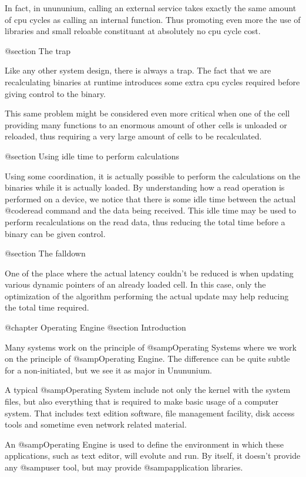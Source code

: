  In fact, in unununium, calling an external service takes exactly the same
 amount of cpu cycles as calling an internal function.  Thus promoting even
 more the use of libraries and small reloable constituant at absolutely no
 cpu cycle cost.

@section The trap

 Like any other system design, there is always a trap.  The fact that we are
 recalculating binaries at runtime introduces some extra cpu cycles required
 before giving control to the binary.

 This same problem might be considered even more critical when one of the cell
 providing many functions to an enormous amount of other cells is unloaded
 or reloaded, thus requiring a very large amount of cells to be recalculated.

@section Using idle time to perform calculations

 Using some coordination, it is actually possible to perform the calculations
 on the binaries while it is actually loaded.  By understanding how a read
 operation is performed on a device, we notice that there is some idle time
 between the actual @code{read} command and the data being received.  This
 idle time may be used to perform recalculations on the read data, thus
 reducing the total time before a binary can be given control.
 
@section The falldown

 One of the place where the actual latency couldn't be reduced is when updating
 various dynamic pointers of an already loaded cell.  In this case, only the
 optimization of the algorithm performing the actual update may help reducing
 the total time required.

@chapter Operating Engine
@section Introduction

 Many systems work on the principle of @samp{Operating Systems} where we work
 on the principle of @samp{Operating Engine}.  The difference can be quite
 subtle for a non-initiated, but we see it as major in Unununium.

 A typical @samp{Operating System} include not only the kernel with the system
 files, but also everything that is required to make basic usage of a computer
 system.  That includes text edition software, file management facility, disk
 access tools and sometime even network related material.

 An @samp{Operating Engine} is used to define the environment in which these
 applications, such as text editor, will evolute and run.  By itself, it
 doesn't provide any @samp{user tool}, but may provide @samp{application
 libraries}.

